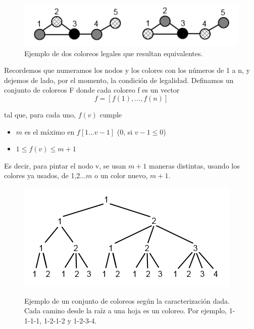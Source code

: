 \begin{figure}[H]
	\centering
	\includegraphics[scale=1]{ejemplo-mismos-coloreos.png}
\caption{Ejemplo de dos coloreos legales que resultan equivalentes.}
\label{fig:ejemploRepeticionColoreo}
\end{figure}



Recordemos que numeramos los nodos y los colores con los n\'umeros de 1 a n, y dejemos de lado, por el momento, la condici\'on de legalidad.
Definamos un conjunto de coloreos F donde cada coloreo f es un vector 
$$f = [f(1), ... , f(n)]$$


tal que, para cada uno, $f(v)$ cumple

\begin{itemize}
	\item $m$ es el m\'aximo en $f[1...v-1]$ (0, si $v-1 \leq 0$)
	\item $1 \leq f(v) \leq m+1$
\end{itemize}

Es decir, para pintar el nodo v, se usan $m+1$ maneras distintas, usando los colores ya usados, de 1,2...$m$ o un color nuevo, $m+1$.

\begin{figure}[H]
	\centering
	\includegraphics[scale=1]{ejemplo-coloreos-distintos.png}
\label{fig:ejemploColoreosDistintos}
\caption{Ejemplo de un conjunto de coloreos seg\'un la caracterizaci\'on dada. Cada camino desde la ra\'iz a una hoja es un coloreo. Por ejemplo, 1-1-1-1, 1-2-1-2 y 1-2-3-4.}
\end{figure}


